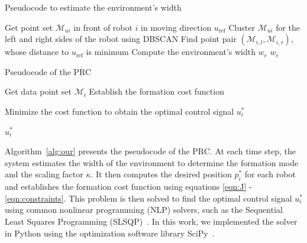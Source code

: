 \begin{algorithm}[h!]
\caption{Pseudocode to estimate the environment's width}
\label{alg:we}
Get point set $\mathcal{M}_{ui}$ in front of robot $i$ in moving direction $u_\text{ref}$
Cluster $\mathcal{M}_{ui}$ for the left and right sides of the robot using DBSCAN\;
Find point pair $\left(\mathcal{M}_{i,l},\mathcal{M}_{i,r}\right)$, whose distance to $u_\text{ref}$ is minimum\;
Compute the environment's width $w_e$
\Return $w_e$\;
\end{algorithm}

\begin{algorithm}[h!]
\caption{Pseudocode of the PRC}
\label{alg:our}
Get data point set $\mathcal{M}_i$\;
Establish the formation cost function

Minimize the cost function to obtain the optimal control signal $u_i^*$

\Return $u_i^*$\;
\end{algorithm}

Algorithm~\ref{alg:our} presents the pseudocode of the PRC. At each time step, the system estimates the width of the environment to determine the formation mode and the scaling factor $\kappa$. It then computes the desired position $p_i^*$ for each robot and establishes the formation cost function using equations \eqref{eqn:J} - \eqref{eqn:constraints}. This problem is then solved to find the optimal control signal $u_i^*$ using common nonlinear programming (NLP)
solvers, such as the Sequential Least Squares Programming (SLSQP)~\cite{kraft1988software}. In this work, we implemented the solver in Python using the optimization software library SciPy~\cite{2020SciPy-NMeth}.